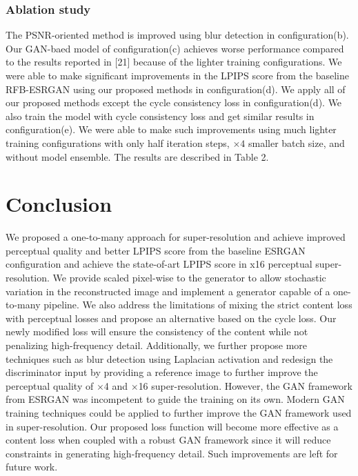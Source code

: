 \documentclass{article}
\begin{document}
\subsubsection{Ablation study}

The PSNR-oriented method is improved using blur detection in configuration(b). Our GAN-baed model of configuration(c) achieves worse performance compared to the results reported in [21] because of the lighter training configurations.  We were able to make significant improvements in the LPIPS score from the baseline RFB-ESRGAN using our proposed methods in configuration(d). We apply all of our proposed methods except the cycle consistency loss in configuration(d). We also train the model with cycle consistency loss and get similar results in configuration(e). We were able to make such improvements using much lighter training configurations with only half iteration steps, $\times4$ smaller batch size, and without model ensemble. The results are described in Table 2.

\section{Conclusion}




We proposed a one-to-many approach for super-resolution and achieve improved perceptual quality and better LPIPS score from the baseline ESRGAN configuration and achieve the state-of-art LPIPS score in x16 perceptual super-resolution. We provide scaled pixel-wise to the generator to allow stochastic variation in the reconstructed image and implement a generator capable of a one-to-many pipeline. We also address the limitations of mixing the strict content loss with perceptual losses and propose an alternative based on the cycle loss. Our newly modified loss will ensure the consistency of the content while not penalizing high-frequency detail. Additionally, we further propose more techniques such as blur detection using Laplacian activation and redesign the discriminator input by providing a reference image to further improve the perceptual quality of $\times$4 and $\times$16 super-resolution. However, the GAN framework from ESRGAN was incompetent to guide the training on its own. Modern GAN training techniques could be applied to further improve the GAN framework used in super-resolution. Our proposed loss function will become more effective as a content loss when coupled with a robust GAN framework since it will reduce constraints in generating high-frequency detail. Such improvements are left for future work.
\end{document}
